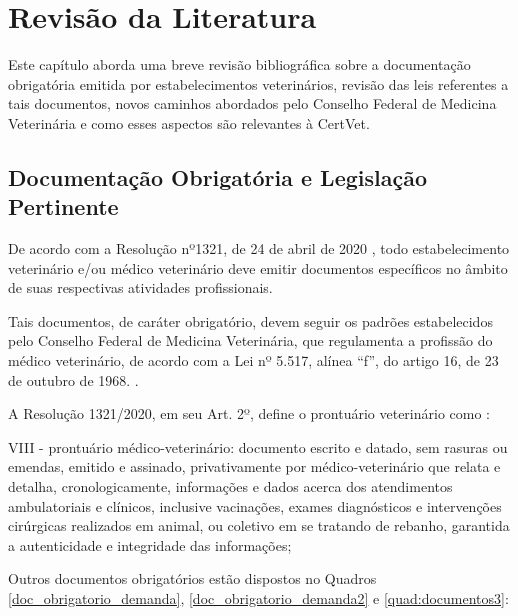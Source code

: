 \documentclass[
    12pt,               %
    openright,          %
    oneside,
    a4paper,            %
    BIBLATEX,           %
    TODO,               %
    english,            %
    brazil              %
    ]{ifsp-spo-inf-ctds}
\begin{document}
\chapter[Revisão de Literatura]{Revisão da Literatura} \label{revisao_lit}

    Este capítulo aborda uma breve revisão bibliográfica sobre a documentação obrigatória emitida por estabelecimentos veterinários, revisão das leis referentes a tais documentos, novos caminhos abordados pelo Conselho Federal de Medicina Veterinária e como esses aspectos são relevantes à CertVet.


    \section{Documentação Obrigatória e Legislação Pertinente}
    
        De acordo com a Resolução nº1321, de 24 de abril de 2020 , todo estabelecimento veterinário e/ou médico veterinário deve emitir documentos específicos no âmbito de suas respectivas atividades profissionais.
        
        Tais documentos, de caráter obrigatório, devem seguir os padrões estabelecidos pelo Conselho Federal de Medicina Veterinária, que regulamenta a profissão do médico veterinário, de acordo com a Lei nº 5.517, alínea “f”, do artigo 16, de 23 de outubro de 1968. .
        
        A Resolução 1321/2020, em seu Art. 2º, define o prontuário veterinário como : 
    
        \begin{citacao}
            
        
            VIII - prontuário médico-veterinário: documento escrito e datado, sem rasuras ou emendas, emitido e assinado, privativamente por médico-veterinário que relata e detalha, cronologicamente, informações e dados acerca dos atendimentos ambulatoriais e clínicos, inclusive vacinações, exames diagnósticos e intervenções cirúrgicas realizados em animal, ou coletivo em se tratando de rebanho, garantida a autenticidade e integridade das informações;
        \end{citacao}
    
        Outros documentos obrigatórios estão dispostos no Quadros \ref{doc_obrigatorio_demanda}, \ref{doc_obrigatorio_demanda2} e \ref{quad:documentos3}: 
\end{document}
